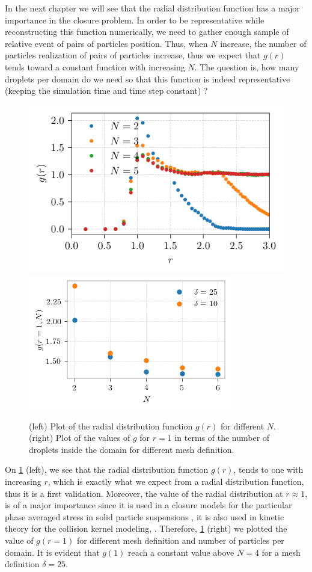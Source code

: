 In the next chapter we will see that the radial distribution function has a major importance in the closure problem. 
In order to be representative while reconstructing this function numerically, we need to gather enough sample of relative event of pairs of particles position. 
Thus, when $N$ increase, the number of particles realization of pairs of particles increase, thus we expect that $g(r)$ tends toward a constant function with increasing $N$. 
The question is, how many droplets per domain do we need so that this function is indeed representative (keeping the simulation time and time step constant) ? 
\begin{figure}[h!]
    \centering
    \includegraphics[height= 0.3\textwidth]{image/VALIDATION/fDist/g_r.pdf}
    \includegraphics[height= 0.3\textwidth]{image/VALIDATION/fDist/N_g_1.pdf}
    \caption{(left) Plot of the radial distribution function $g(r)$ for different $N$. 
             (right) Plot of the values of $g$ for $r =1$ in terms of the number of droplets inside the domain for different mesh definition. }
    \label{fig:g_r}
\end{figure}
On \ref{fig:g_r} (left), we see that the radial distribution function $g(r)$, tends to one with increasing $r$, which is exactly what we expect from a radial distribution function, thus it is a first validation. 
Moreover, the value of the radial distribution at $r\approx1$, is of a major importance since it is used in a closure models for the particular phase averaged stress in solid particle suspensions \citep{jackson2000dynamics}, it is also used in kinetic theory for the collision kernel modeling, \citep{fede2015monte}.
Therefore, \ref{fig:g_r} (right) we plotted the value of $g(r=1)$ for different mesh definition and number of particles per domain. 
It is evident that $g(1)$ reach a constant value above $N=4$ for a mesh definition $\delta = 25$. 

